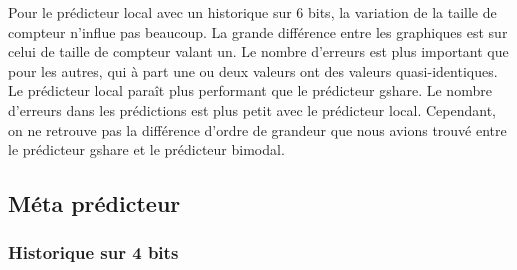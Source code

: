 \documentclass{article}
\begin{document}
Pour le prédicteur local avec un historique sur 6 bits, la variation de la taille de compteur n'influe pas beaucoup. La grande différence entre les graphiques est sur celui de taille de compteur valant un. Le nombre d'erreurs est plus important que pour les autres, qui à part une ou deux valeurs ont des valeurs quasi-identiques. \\

Le prédicteur local paraît plus performant que le prédicteur gshare. Le nombre d'erreurs dans les prédictions est plus petit avec le prédicteur local. Cependant, on ne retrouve pas la différence d'ordre de grandeur que nous avions trouvé entre le prédicteur gshare et le prédicteur bimodal. 

\subsection{Méta prédicteur}

\subsubsection{Historique sur 4 bits}
\end{document}
